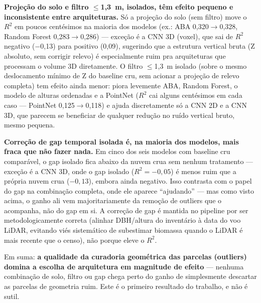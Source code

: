 \textbf{Projeção do solo e filtro $\leq$1,3~m, isolados, têm efeito pequeno e
inconsistente entre arquiteturas.} Só a projeção do solo (sem filtro) move o $R^2$
em poucos centésimos na maioria dos modelos (ex.: ABA 0,320$\rightarrow$0,328,
Random Forest 0,283$\rightarrow$0,286) --- exceção é a CNN 3D (voxel), que sai de
$R^2$ negativo ($-$0,13) para positivo (0,09), sugerindo que a estrutura vertical
bruta (Z absoluto, sem corrigir relevo) é especialmente ruim pra arquiteturas que
processam o volume 3D diretamente. O filtro $\leq$1,3~m isolado (sobre o mesmo
deslocamento mínimo de Z do baseline cru, sem acionar a projeção de relevo
completa) tem efeito ainda menor: piora levemente ABA, Random Forest, o modelo de
alturas ordenadas e a PointNet ($R^2$ cai alguns centésimos em cada caso ---
PointNet 0,125$\rightarrow$0,118) e ajuda discretamente só a CNN 2D e a CNN 3D,
que parecem se beneficiar de qualquer redução no ruído vertical bruto, mesmo
pequena.

\textbf{Correção de gap temporal isolada é, na maioria dos modelos, mais fraca que
não fazer nada.} Em cinco dos seis modelos com baseline cru comparável, o gap
isolado fica abaixo da nuvem crua sem nenhum tratamento --- exceção é a CNN 3D,
onde o gap isolado ($R^2 = -0,05$) é menos ruim que a própria nuvem crua
($-0,13$), embora ainda negativo. Isso contrasta com o papel do gap na combinação
completa, onde ele aparece ``ajudando'' --- mas como visto acima, o ganho ali vem
majoritariamente da remoção de outliers que o acompanha, não do gap em si. A
correção de gap é mantida no pipeline por ser metodologicamente correta (alinhar
DBH/altura do inventário à data do voo LiDAR, evitando viés sistemático de
subestimar biomassa quando o LiDAR é mais recente que o censo), não porque eleve o
$R^2$.

Em suma: \textbf{a qualidade da curadoria geométrica das parcelas (outliers)
domina a escolha de arquitetura em magnitude de efeito} --- nenhuma combinação de
solo, filtro ou gap chega perto do ganho de simplesmente descartar as parcelas de
geometria ruim. Este é o primeiro resultado do trabalho, e não é sutil.

